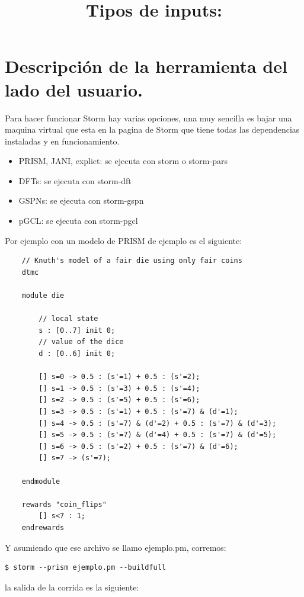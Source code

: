 \documentclass[11pt]{article}
\begin{document}
\section{Descripci\'on de la herramienta del lado del usuario.}

Para hacer funcionar Storm hay varias opciones, una muy sencilla es bajar una maquina virtual que esta en la pagina de Storm que tiene todas las dependencias instaladas y en funcionamiento.


\title{Tipos de inputs:}

\begin{itemize}
	\item PRISM, JANI, explict: se ejecuta con storm o storm-pars
	
	\item DFTs: se ejecuta con storm-dft

	\item GSPNs: se ejecuta con storm-gspn

	\item pGCL: se ejecuta con storm-pgcl
\end{itemize} 

Por ejemplo con un modelo de PRISM de ejemplo es el siguiente:

\begin{verbatim}
	// Knuth's model of a fair die using only fair coins
	dtmc
	
	module die
	
		// local state
		s : [0..7] init 0;
		// value of the dice
		d : [0..6] init 0;
		
		[] s=0 -> 0.5 : (s'=1) + 0.5 : (s'=2);
		[] s=1 -> 0.5 : (s'=3) + 0.5 : (s'=4);
		[] s=2 -> 0.5 : (s'=5) + 0.5 : (s'=6);
		[] s=3 -> 0.5 : (s'=1) + 0.5 : (s'=7) & (d'=1);
		[] s=4 -> 0.5 : (s'=7) & (d'=2) + 0.5 : (s'=7) & (d'=3);
		[] s=5 -> 0.5 : (s'=7) & (d'=4) + 0.5 : (s'=7) & (d'=5);
		[] s=6 -> 0.5 : (s'=2) + 0.5 : (s'=7) & (d'=6);
		[] s=7 -> (s'=7);
		
	endmodule
	
	rewards "coin_flips"
		[] s<7 : 1;
	endrewards
\end{verbatim}

Y asumiendo que ese archivo se llamo ejemplo.pm, corremos:

\begin{verbatim}
$ storm --prism ejemplo.pm --buildfull
\end{verbatim}
					
la salida de la corrida es la siguiente:
\end{document}
